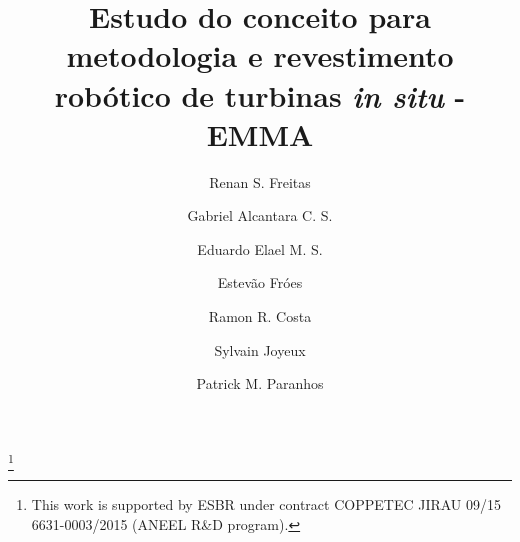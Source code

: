 \documentclass{main}
\begin{document}
\begin{frontmatter}

\title{Estudo do conceito para metodologia e revestimento robótico
de turbinas \textit{in situ} - EMMA
} 

\thanks[footnoteinfo]{This work is supported by ESBR under contract COPPETEC
JIRAU 09/15 6631-0003/2015 (ANEEL R\&D program).}

\author[1]{Renan S. Freitas}
\author[1]{Gabriel Alcantara C. S.}
\author[1]{Eduardo Elael M. S.}
\author[1]{Estevão Fróes}
\author[1]{Ramon R. Costa}
\author[2]{Sylvain Joyeux}
\author[2]{Patrick M. Paranhos}

  \address[1]{Departamento de Engenharia Elétrica, COPPE UFRJ, Rio de Janeiro,
  Brasil} 
  \address[2]{Centro de Inovação em Robótica (CIR), Rio de Janeiro, Brasil}
  
\begin{abstract}                %
\end{abstract} 
 
\begin{keyword}
\end{keyword}

\end{frontmatter}

 



%
%
 

  
 
\appendix
\end{document}
